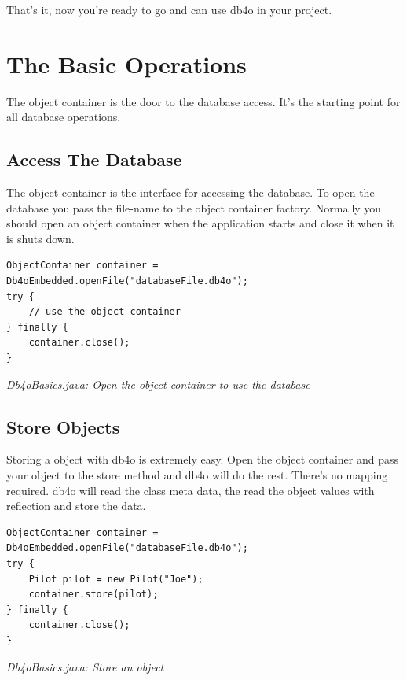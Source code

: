 That's it, now you're ready to go and can use db4o in your project.

\section{The Basic Operations}
\label{ref:basics-object-container}

The object container is the door to the database access. It's the starting point for all database operations.

\subsection{Access The Database}
\label{ref:basics-object-container:accessingdb}

The object container is the interface for accessing the database. To open the database you pass the file-name to the object container factory. Normally you should open an object container when the application starts and close it when it is shuts down.

\begin{lstlisting}
ObjectContainer container = Db4oEmbedded.openFile("databaseFile.db4o");
try {
    // use the object container
} finally {
    container.close();
}
\end{lstlisting}

{\small\itshape Db4oBasics.java: Open the object container to use the database\par}
\medskip

\subsection{Store Objects}
\label{ref:basics-object-container:storingobject}

Storing a object with db4o is extremely easy. Open the object container and pass your object to the store method and db4o will do the rest. There's no mapping required. db4o will read the class meta data, the read the object values with reflection and store the data.

\begin{lstlisting}
ObjectContainer container = Db4oEmbedded.openFile("databaseFile.db4o");
try {
    Pilot pilot = new Pilot("Joe");
    container.store(pilot);
} finally {
    container.close();
}
\end{lstlisting}

{\small\itshape Db4oBasics.java: Store an object\par}
\medskip

